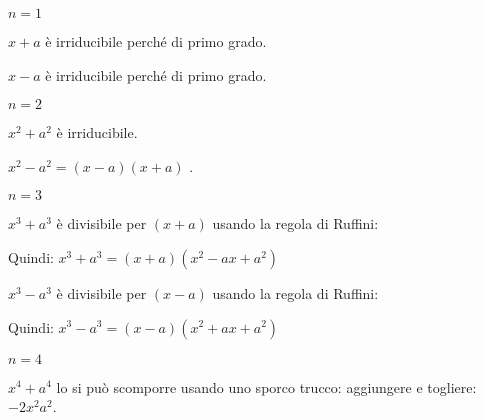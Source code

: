 \begin{itemize*}
\item \(n=1\)
 \begin{itemize*}
  \item \(x+a\) è irriducibile perché di primo grado.
  \item \(x-a\) è irriducibile perché di primo grado.
 \end{itemize*}

 \item \(n=2\)
 \begin{itemize*}
  \item \(x^2+a^2\) è irriducibile.
  \item \(x^2-a^2=(x-a)(x+a)\) .
 \end{itemize*}

 \item \(n=3\)
 \begin{itemize*}
  \item 
 \begin{multicols}{2}
  \(x^3+a^3\) è divisibile per \((x+a)\) usando la regola di Ruffini:
   \begin{inaccessibleblock}
    \begin{center}
%     
    \binomogeneiruffinia
    \end{center}
    \end{inaccessibleblock}
 \end{multicols}
   Quindi: \(x^3+a^3=(x+a)(x^2-ax+a^2)\)
  \item 
 \begin{multicols}{2}
  \(x^3-a^3\) è divisibile per \((x-a)\) usando la regola di Ruffini:
   \begin{inaccessibleblock}
    \begin{center}
%     
    \binomogeneiruffinib
    \end{center}
    \end{inaccessibleblock}
 \end{multicols}
   Quindi: \(x^3-a^3=(x-a)(x^2+ax+a^2)\)
 \end{itemize*}

 \item \(n=4\)
 \begin{itemize*}
  \item \(x^4+a^4\) lo si può scomporre usando uno sporco trucco: 
   aggiungere e togliere:~\(-2x^2a^2\).
   

\end{itemize*}
\end{itemize*}
